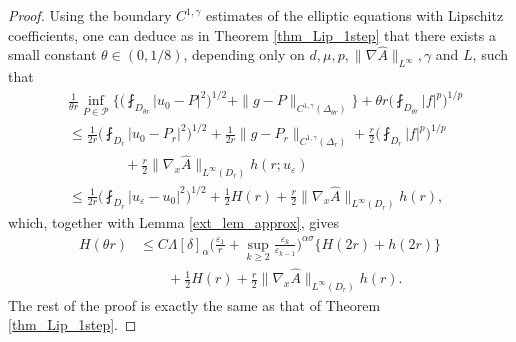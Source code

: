 \documentclass[reqno,12pt]{amsart} %
\theoremstyle{definition}
\theoremstyle{remark}
\numberwithin{equation}{section}
\newcommand{\e}{\varepsilon}
\begin{document}
\begin{proof}
    Using the boundary $C^{1, \gamma}$ estimates of the elliptic equations with Lipschitz coefficients, one can deduce as in Theorem \ref{thm_Lip_1step} that there exists a small constant $\theta\in (0, 1/8)$, depending only on $d, \mu, p, \|\nabla \widehat{A}\|_{L^\infty}, \gamma $ and $ L$, such that
  \begin{align*}
    &\frac{1}{\theta r}\inf_{P\in \mathcal{P}}\bigg\{\bigg(\fint_{D_{\theta r}}|u_0-P|^2\bigg)^{1/2}+\|g-P\|_{C^{1, \gamma}(\Delta_{\theta r})}\bigg\}+\theta r\bigg(\fint_{D_{\theta r}}|f|^p\bigg)^{1/p}\\
    &\leq \frac{1}{2r}\bigg(\fint_{D_{r}}|u_0-P_r|^2\bigg)^{1/2}+\frac{1}{2r}\|g-P_r\|_{C^{1, \gamma}(\Delta_r)}+\frac{r}{2}\bigg(\fint_{D_{r}}|f|^p\bigg)^{1/p}\\
    &\qquad\qquad+\frac{r}{2}\|\nabla_x\widehat{A}\|_{L^\infty(D_r)} h(r; u_\varepsilon)\\
    &\leq \frac{1}{2r}\bigg(\fint_{D_{r}}|u_\varepsilon-u_0|^2\bigg)^{1/2}+\frac{1}{2}H(r)+\frac{r}{2}\|\nabla_x\widehat{A}\|_{L^\infty(D_r)} h(r),
  \end{align*}
  which, together with Lemma \ref{ext_lem_approx}, gives
  \begin{align*}
    H(\theta r)&\leq C\Lambda [\delta]_\alpha\bigg(\frac{\varepsilon_1}{r}+\sup_{k\geq 2}\frac{\e_k}{\e_{k-1}}\bigg)^{\alpha\sigma}\{H(2r)+h(2r)\}\\
    &\qquad+\frac{1}{2}H(r)+\frac{r}{2}\|\nabla_x\widehat{A}\|_{L^\infty(D_r)} h(r).
  \end{align*}
  The rest of the proof is exactly the same as that of Theorem \ref{thm_Lip_1step}. 
\end{proof}
\end{document}
